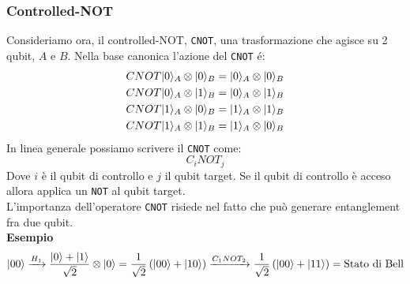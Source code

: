 \documentclass[12pt, a4paper]{report}
\begin{document}
\subsubsection{Controlled-NOT}
Consideriamo ora, il controlled-NOT, \texttt{CNOT}, una trasformazione che agisce su 2 qubit, $A$ e $B$. Nella base canonica l'azione del \texttt{CNOT} é:
\begin{equation*}
    \begin{split}
        CNOT | 0 \rangle_{A}\otimes | 0 \rangle_{B} &= | 0 \rangle_{A}\otimes | 0 \rangle_{B} \\
        CNOT | 0 \rangle_{A}\otimes | 1 \rangle_{B} &= | 0 \rangle_{A}\otimes | 1 \rangle_{B} \\
        CNOT | 1 \rangle_{A}\otimes | 0 \rangle_{B} &= | 1 \rangle_{A}\otimes | 1 \rangle_{B} \\
        CNOT | 1 \rangle_{A}\otimes | 1 \rangle_{B} &= | 1 \rangle_{A}\otimes | 0 \rangle_{B} 
    \end{split}
\end{equation*}
In linea generale possiamo scrivere il \texttt{CNOT} come:
\begin{equation*}
    C_{i}NOT_{j}
\end{equation*}
Dove $i$ è il qubit di controllo e $j$ il qubit target. Se il qubit di controllo è acceso allora applica un \texttt{NOT} al qubit target.\\
L'importanza dell'operatore \texttt{CNOT} risiede nel fatto che può generare entanglement fra due qubit.\\
\textbf{Esempio}
\begin{equation*}
    | 00 \rangle \xrightarrow{H_{1}} \frac{| 0 \rangle+| 1 \rangle}{\sqrt{2}} \otimes | 0 \rangle = \frac{1}{\sqrt{2}}\left(| 00 \rangle+| 10 \rangle\right) \xrightarrow{C_{1}NOT_{2}} \frac{1}{\sqrt{2}}\left(| 00 \rangle+| 11 \rangle\right) = \text{Stato di Bell}
\end{equation*}
\end{document}
